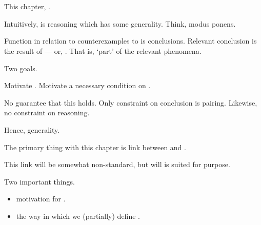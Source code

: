\chapter{}
\label{cha:typical}

\begin{note}
  This chapter, \tR{}.

  Intuitively, \tR{} is reasoning which has some generality.
  Think, modus ponens.
\end{note}

\begin{note}
  Function in relation to counterexamples to \issueConstraint{} is conclusions.
  Relevant conclusion is the result of \tR{} --- or, \tR[concluding]{}.
  That is, `part' of the relevant phenomena.

  Two goals.

  Motivate \tR{}.
  Motivate a necessary condition on \tR{}.
\end{note}

\begin{note}
  No guarantee that this holds.
  Only constraint on conclusion is pairing.
  Likewise, no constraint on reasoning.

  Hence, generality.
\end{note}

\begin{note}
  The primary thing with this chapter is link between \tor{} and \tR{}.

  This link will be somewhat non-standard, but will is suited for purpose.
\end{note}

\begin{note}
  Two important things.

  \begin{itemize}
  \item
    motivation for \tR{}.
  \item
    the way in which we (partially) define \tR{}.
  \end{itemize}
\end{note}

\begin{note}
  \begin{TOCEnum}
  \item
  \item
  \item
  \end{TOCEnum}
\end{note}

